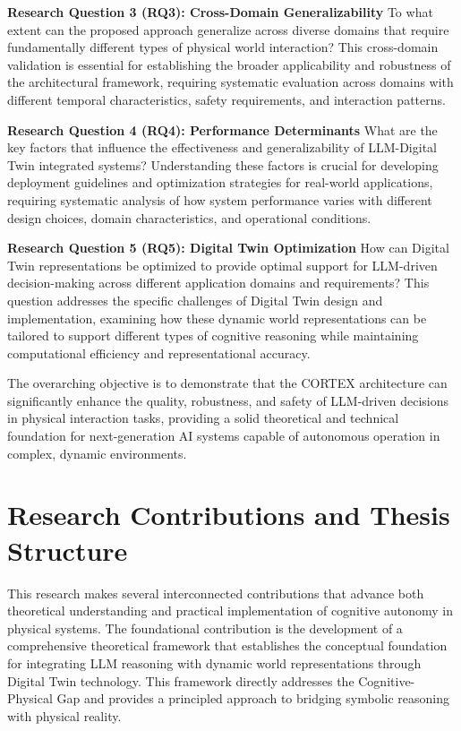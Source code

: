 \textbf{Research Question 3 (RQ3): Cross-Domain Generalizability}
To what extent can the proposed approach generalize across diverse domains that require fundamentally different types of physical world interaction? This cross-domain validation is essential for establishing the broader applicability and robustness of the architectural framework, requiring systematic evaluation across domains with different temporal characteristics, safety requirements, and interaction patterns.

\textbf{Research Question 4 (RQ4): Performance Determinants}
What are the key factors that influence the effectiveness and generalizability of LLM-Digital Twin integrated systems? Understanding these factors is crucial for developing deployment guidelines and optimization strategies for real-world applications, requiring systematic analysis of how system performance varies with different design choices, domain characteristics, and operational conditions.

\textbf{Research Question 5 (RQ5): Digital Twin Optimization}
How can Digital Twin representations be optimized to provide optimal support for LLM-driven decision-making across different application domains and requirements? This question addresses the specific challenges of Digital Twin design and implementation, examining how these dynamic world representations can be tailored to support different types of cognitive reasoning while maintaining computational efficiency and representational accuracy.

The overarching objective is to demonstrate that the CORTEX architecture can significantly enhance the quality, robustness, and safety of LLM-driven decisions in physical interaction tasks, providing a solid theoretical and technical foundation for next-generation AI systems capable of autonomous operation in complex, dynamic environments.

\section{Research Contributions and Thesis Structure}

This research makes several interconnected contributions that advance both theoretical understanding and practical implementation of cognitive autonomy in physical systems. The foundational contribution is the development of a comprehensive theoretical framework that establishes the conceptual foundation for integrating LLM reasoning with dynamic world representations through Digital Twin technology. This framework directly addresses the Cognitive-Physical Gap and provides a principled approach to bridging symbolic reasoning with physical reality.

